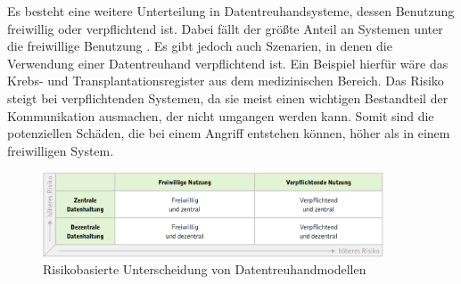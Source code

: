 \documentclass{scrreprt}
\begin{document}
Es besteht eine weitere Unterteilung in Datentreuhandsysteme, dessen Benutzung freiwillig oder verpflichtend ist. Dabei fällt der größte Anteil an Systemen unter die freiwillige Benutzung . Es gibt jedoch auch Szenarien, in denen die Verwendung einer Datentreuhand verpflichtend ist. Ein Beispiel hierfür wäre das Krebs- und Transplantationsregister aus dem medizinischen Bereich. Das Risiko steigt bei verpflichtenden Systemen, da sie meist einen wichtigen Bestandteil der Kommunikation ausmachen, der nicht umgangen werden kann. Somit sind die potenziellen Schäden, die bei einem Angriff entstehen können, höher als in einem freiwilligen System.

\begin{figure}
    \centering
    \includegraphics[width=0.9\textwidth]{DT-RisikoEinteilung.png}
    \caption{Risikobasierte Unterscheidung von Datentreuhandmodellen \cite{dt-blankertz2021neue}}
    \label{fig:dt-risikoeinteilug}
\end{figure}
\end{document}
